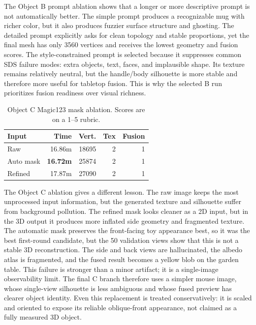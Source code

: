 \documentclass[10pt,twocolumn,letterpaper]{article}
\begin{document}
The Object B prompt ablation shows that a longer or more descriptive prompt is not automatically better.
The simple prompt produces a recognizable mug with richer color, but it also produces fuzzier surface structure and ghosting.
The detailed prompt explicitly asks for clean topology and stable proportions, yet the final mesh has only 3560 vertices and receives the lowest geometry and fusion scores.
The style-constrained prompt is selected because it suppresses common SDS failure modes: extra objects, text, faces, and implausible shape.
Its texture remains relatively neutral, but the handle/body silhouette is more stable and therefore more useful for tabletop fusion.
This is why the selected B run prioritizes fusion readiness over visual richness.

\begin{table}[t]
\centering
\caption{Object C Magic123 mask ablation. Scores are on a 1--5 rubric.}
\label{tab:c_mask}
\begin{tabular}{lrrrr}
\toprule
Input & Time & Vert. & Tex & Fusion \\
\midrule
Raw & 16.86m & 18695 & 2 & 1 \\
Auto mask & \textbf{16.72m} & 25874 & 2 & 1 \\
Refined & 17.87m & 27090 & 2 & 1 \\
\bottomrule
\end{tabular}
\end{table}

The Object C ablation gives a different lesson.
The raw image keeps the most unprocessed input information, but the generated texture and silhouette suffer from background pollution.
The refined mask looks cleaner as a 2D input, but in the 3D output it produces more inflated side geometry and fragmented texture.
The automatic mask preserves the front-facing toy appearance best, so it was the best first-round candidate, but the 50 validation views show that this is not a stable 3D reconstruction.
The side and back views are hallucinated, the albedo atlas is fragmented, and the fused result becomes a yellow blob on the garden table.
This failure is stronger than a minor artifact; it is a single-image observability limit.
The final C branch therefore uses a simpler mouse image, whose single-view silhouette is less ambiguous and whose fused preview has clearer object identity.
Even this replacement is treated conservatively: it is scaled and oriented to expose its reliable oblique-front appearance, not claimed as a fully measured 3D object.
\end{document}
